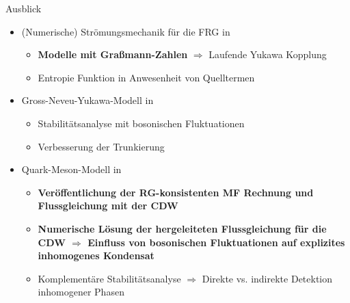 \documentclass[10pt]{beamer}
\begin{document}
\begin{frame}{Ausblick}
	\begin{itemize}
		\item (Numerische) Strömungsmechanik für die FRG in 
		\begin{itemize}
			\item \textbf{Modelle mit Graßmann-Zahlen} $\Rightarrow$ Laufende Yukawa Kopplung
			\item Entropie Funktion in Anwesenheit von Quelltermen
		\end{itemize}\vspace{0.2em}
		\item Gross-Neveu-Yukawa-Modell in 
		\begin{itemize}
			\item Stabilitätsanalyse mit bosonischen Fluktuationen
			\item Verbesserung der Trunkierung
		\end{itemize}\vspace{0.2em}
		\item Quark-Meson-Modell in 
		\begin{itemize}
			\item \textbf{Veröffentlichung der RG-konsistenten MF Rechnung und Flussgleichung mit der CDW}
			\item \textbf{Numerische Lösung der hergeleiteten Flussgleichung für die CDW $\Rightarrow$ Einfluss von bosonischen Fluktuationen auf explizites inhomogenes Kondensat}
			\item Komplementäre Stabilitätsanalyse $\Rightarrow$ Direkte vs. indirekte Detektion inhomogener Phasen
		\end{itemize}
	\end{itemize}

	
	\note{
		
}
\end{frame}
\end{document}
